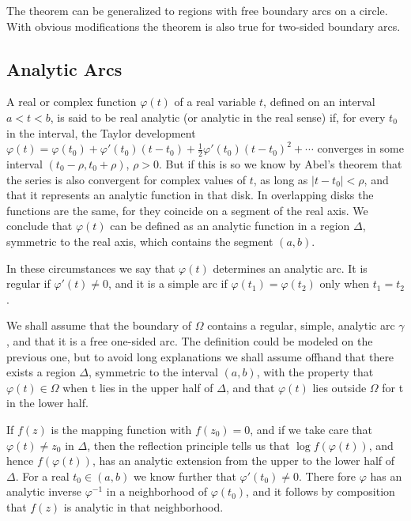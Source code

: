 The theorem can be generalized to regions with free boundary arcs on a circle. With obvious modifications the theorem is also true for two-sided boundary arcs.

\setcounter{section}{1}\setcounter{subsection}{3}\subsection{Analytic Arcs}\label{sec:6.1.4}
A real or complex function $\varphi(t)$ of a real variable $t$, defined on an interval $a < t < b$, is said to be real analytic (or analytic in the real sense) if, for every $t_0$ in the interval, the Taylor development $\varphi(t) = \varphi(t_0) + \varphi'(t_0)(t - t_0) + \frac{1}{2}\varphi'(t_0)(t - t_0)^2 + \cdots$ converges in some interval $(t_0 - \rho, t_0 + \rho)$, $\rho > 0$. But if this is so we know by Abel's theorem that the series is also convergent for complex values of $t$, as long as $|t - t_0| < \rho$, and that it represents an analytic function in that disk. In overlapping disks the functions are the same, for they coincide on a segment of the real axis. We conclude that $\varphi(t)$ can be defined as an analytic function in a region $\Delta$, symmetric to the real axis, which contains the segment $(a,b)$.

In these circumstances we say that $\varphi(t)$ determines an analytic arc. It is regular if $\varphi'(t) \neq 0$, and it is a simple arc if $\varphi(t_1) = \varphi(t_2)$ only when $t_1 = t_2$.

We shall assume that the boundary of $\Omega$ contains a regular, simple, analytic arc $\gamma$, and that it is a free one-sided arc. The definition could be modeled on the previous one, but to avoid long explanations we shall assume offhand that there exists a region $\Delta$, symmetric to the interval $(a,b)$, with the property that $\varphi(t) \in \Omega$ when t lies in the upper half of $\Delta$, and that $\varphi(t)$ lies outside $\Omega$ for t in the lower half.

If $f(z)$ is the mapping function with $f(z_0) = 0$, and if we take care that $\varphi(t) \neq z_0$ in $\Delta$, then the reflection principle tells us that $\log f(\varphi(t))$, and hence $f(\varphi(t))$, has an analytic extension from the upper to the lower half of $\Delta$. For a real $t_0 \in (a, b)$ we know further that $\varphi'(t_0) \neq 0$. There%
%
fore $\varphi$ has an analytic inverse $\varphi^{-1}$ in a neighborhood of $\varphi(t_{0})$, and it follows by composition that $f(z)$ is analytic in that neighborhood.

